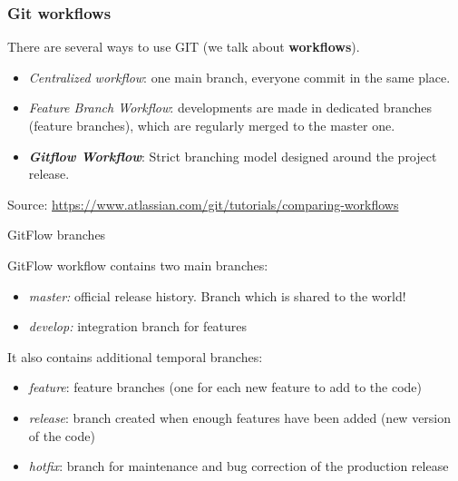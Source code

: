 \documentclass[svgnames]{beamer}
\begin{document}
\begin{frame}
    \frametitle{Git workflows} %
    There are several ways to use GIT (we talk about \textbf{workflows}). 

    \begin{itemize}
        \item \emph{Centralized workflow}: one main branch, everyone commit in the same place.
        \item \emph{Feature Branch Workflow}: developments are made in dedicated branches (feature branches), which are regularly merged to the master one.
        \item \textbf{\textit{Gitflow Workflow}}: Strict branching model designed around the project release.
    \end{itemize}

    Source: \url{https://www.atlassian.com/git/tutorials/comparing-workflows}

\end{frame}

\begin{frame}{GitFlow branches}

    GitFlow workflow contains two main branches:
    \begin{itemize}
        \item{\emph{master:} official release history. Branch which is shared to the world!}
        \item{\emph{develop:} integration branch for features}
    \end{itemize}

    It also contains additional temporal branches:
    \begin{itemize}
        \item{\emph{feature}: feature branches (one for each new feature to add to the code)}
        \item{\emph{release}: branch created when enough features have been added (new version of the code)}
        \item{\emph{hotfix}: branch for maintenance and bug correction of the production release}
    \end{itemize}

\end{frame}
\end{document}
